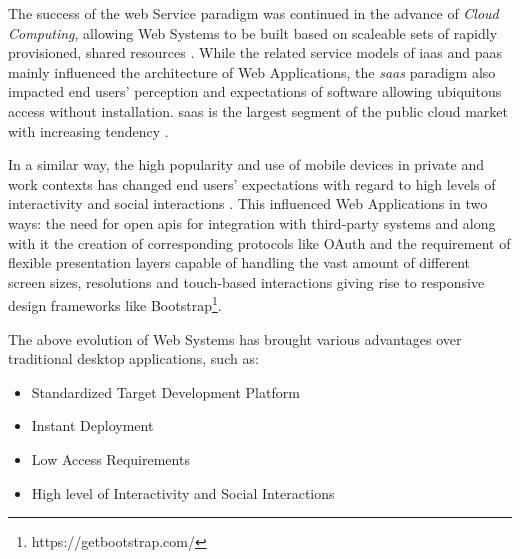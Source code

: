 The success of the \Gls{web} Service paradigm was continued in the advance of \emph{Cloud Computing}, allowing \glspl{Web System} to be built based on scaleable sets of rapidly provisioned, shared resources \autocite{NIST2011CloudComputing}.
While the related service models of \gls{iaas} and \gls{paas} mainly influenced the architecture of \glspl{Web Application}, the \emph{\gls{saas}} paradigm also impacted end users' perception and expectations of software \autocite{BetterCloud2017SaaSWorkplace,Fowley2017CloudSME} allowing ubiquitous access without installation. \gls{saas} is the largest segment of the public cloud market with increasing tendency \autocite{Statista2018SaaSStatistics}.

In a similar way, the high popularity and use of mobile devices \autocite{Statista2018MobileWeb} in private and work contexts has changed end users' expectations with regard to high levels of interactivity and social interactions \autocite{Bitkom2013Arbeit30}.
This influenced \glspl{Web Application} in two ways: the need for open \glspl{api} for integration with third-party systems and along with it the creation of corresponding protocols like OAuth \autocite{Hardt2012Oauth2.0} and the requirement of flexible presentation layers capable of handling the vast amount of different screen sizes, resolutions and touch-based interactions giving rise to responsive design frameworks like Bootstrap\footnote{https://getbootstrap.com/}.

The above evolution of \glspl{Web System} has brought various advantages over traditional desktop applications, such as:

\begin{itemize}
\tightlist
\item
  Standardized Target Development Platform
\item
  Instant Deployment
\item
  Low Access Requirements
\item
  High level of Interactivity and Social Interactions
\end{itemize}

